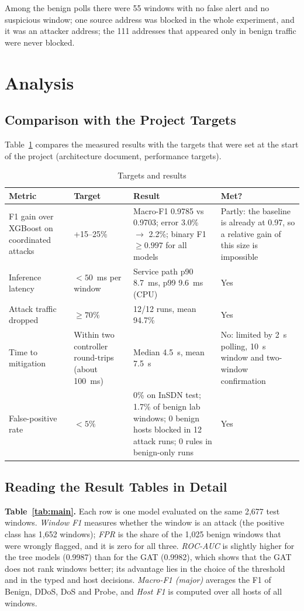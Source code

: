 Among the benign polls there were 55 windows with no false alert and no suspicious window; one source address was blocked in the whole experiment, and it was an attacker address; the 111 addresses that appeared only in benign traffic were never blocked.

\section{Analysis}

\subsection{Comparison with the Project Targets}
Table~\ref{tab:targets} compares the measured results with the targets that were set at the start of the project (architecture document, performance targets).

\begin{table}[htbp]
\centering
\caption{Targets and results}
\label{tab:targets}
\small
\begin{tabularx}{\textwidth}{|p{3.6cm}|p{3.4cm}|p{3.6cm}|X|}
\hline
\textbf{Metric} & \textbf{Target} & \textbf{Result} & \textbf{Met?} \\ \hline
F1 gain over XGBoost on coordinated attacks & +15--25\% & Macro-F1 0.9785 vs 0.9703; error 3.0\% $\to$ 2.2\%; binary F1 $\ge 0.997$ for all models & Partly: the baseline is already at 0.97, so a relative gain of this size is impossible \\ \hline
Inference latency & $<50$~ms per window & Service path p90 8.7~ms, p99 9.6~ms (CPU) & Yes \\ \hline
Attack traffic dropped & $\ge 70\%$ & 12/12 runs, mean 94.7\% & Yes \\ \hline
Time to mitigation & Within two controller round-trips (about 100~ms) & Median 4.5~s, mean 7.5~s & No: limited by 2~s polling, 10~s window and two-window confirmation \\ \hline
False-positive rate & $<5\%$ & 0\% on InSDN test; 1.7\% of benign lab windows; 0 benign hosts blocked in 12 attack runs; 0 rules in benign-only runs & Yes \\ \hline
\end{tabularx}
\end{table}

\subsection{Reading the Result Tables in Detail}
\textbf{Table~\ref{tab:main}.} Each row is one model evaluated on the same 2,677 test windows. \emph{Window F1} measures whether the window is an attack (the positive class has 1,652 windows); \emph{FPR} is the share of the 1,025 benign windows that were wrongly flagged, and it is zero for all three. \emph{ROC-AUC} is slightly higher for the tree models (0.9987) than for the GAT (0.9982), which shows that the GAT does not rank windows better; its advantage lies in the choice of the threshold and in the typed and host decisions. \emph{Macro-F1 (major)} averages the F1 of Benign, DDoS, DoS and Probe, and \emph{Host F1} is computed over all hosts of all windows.\\

